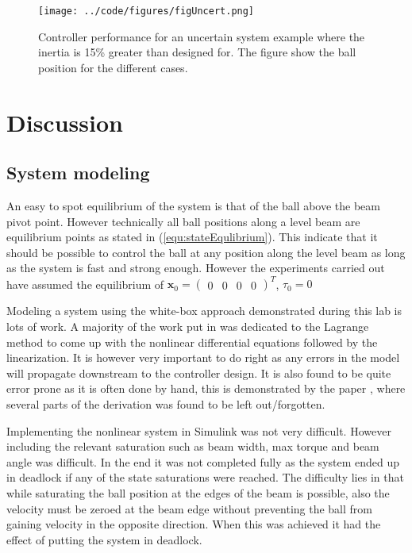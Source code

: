 \documentclass[a4paper, titlepage]{article}
\begin{document}
\begin{figure}[H]
\center
\texttt{[image: ../code/figures/figUncert.png]}
\caption{Controller performance for an uncertain system example where the inertia is 15\% greater than designed for. The figure show the ball position for the different cases.}
\label{fig:uncert}
\end{figure}


\section{Discussion}
\subsection{System modeling}
An easy to spot equilibrium of the system is that of the ball above the beam pivot point.
However technically all ball positions along a level beam are equilibrium points as stated in (\ref{equ:stateEqulibrium}).
This indicate that it should be possible to control the ball at any position along the level beam as long as the system is fast and strong enough.
However the experiments carried out have assumed the equilibrium of $\textbf{x}_0 = \begin{pmatrix} 0 & 0 & 0 & 0 \end{pmatrix}^T$, $\tau_0 = 0$


Modeling a system using the white-box approach demonstrated during this lab is lots of work.
A majority of the work put in was dedicated to the Lagrange method to come up with the nonlinear differential equations followed by the linearization.
It is however very important to do right as any errors in the model will propagate downstream to the controller design.
It is also found to be quite error prone as it is often done by hand, this is demonstrated by the paper \citep{BolvarVincenty2014ModellingTB}, where several parts of the derivation was found to be left out/forgotten.

Implementing the nonlinear system in Simulink was not very difficult.
However including the relevant saturation such as beam width, max torque and beam angle was difficult.
In the end it was not completed fully as the system ended up in deadlock if any of the state saturations were reached.
The difficulty lies in that while saturating the ball position at the edges of the beam is possible, also the velocity must be zeroed at the beam edge without preventing the ball from gaining velocity in the opposite direction.
When this was achieved it had the effect of putting the system in deadlock.
\end{document}
